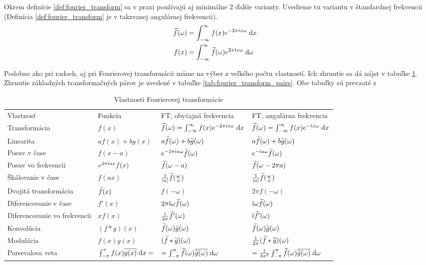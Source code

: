 Okrem definície \ref{def:fourier_transform} sa v praxi používajú aj
minimálne 2 ďalšie varianty. Uvedieme tu variantu v štandardnej
frekvencii (Definícia \ref{def:fourier_transform} je v takzvanej
angulárnej frekvencii).
\begin{eqnarray}
    \widetilde{f}(\omega) &= \int_{-\infty}^{\infty} f(x) e^{-2\pi\hat{\imath} x \omega} \; \mathrm{d} x\\
    f(x) &= \int_{-\infty}^{\infty} \widetilde{f}(\omega) e^{2\pi\hat{\imath} x \omega} \; \mathrm{d}
    \omega
\end{eqnarray}

Podobne ako pri radoch, aj pri Fourierovej transformácii máme na výber
z veľkého počtu vlastností. Ich zhrnutie sa dá nájst v tabuľke
\ref{tab:fourier_transform_vlastnosti}. Zhrnutie základných
transformačných párov je uvedené v tabuľke
\ref{tab:fourier_transform_pairs}. Obe tabuľky sú prevzaté z
\cite{wiki:fourier_transform}

\begin{table}[htp]
    \centering
    \begin{tabular}{llll}
    Vlastnosť&Funkcia&FT, obyčajná frekvencia&FT, angulárna
    frekvencia\\
    Transformácia&$f(x)$&
        $\widetilde{f}(\omega) = \int_{-\infty}^{\infty} f(x) e^{-2\pi\hat{\imath} x\omega} \; \mathrm{d} x$&
        $\widetilde{f}(\omega) = \int_{-\infty}^{\infty} f(x) e^{-\hat{\imath} x \omega} \; \mathrm{d} x$\\
    Linearita&$a f(x) + b g(x)$&
        $a \widetilde{f}(\omega) + b \widetilde{g}(\omega)$&
        $a \widetilde{f}(\omega) + b \widetilde{g}(\omega)$\\
    Posuv v čase&$f(x-a)$&
        $e^{-2\pi\hat{\imath} a \omega} \widetilde{f}(\omega)$&
        $e^{-\hat{\imath} a \omega} \widetilde{f}(\omega)$\\
    Posuv vo frekvencii&$ e^{2\pi\hat{\imath} a x} f(x)$&
        $\widetilde{f}(\omega-a)$&
        $\widetilde{f}(\omega-2\pi a)$\\
    Škálovanie v čase&$ f(a x)$&
        $\frac{1}{|a|}\widetilde{f}(\frac{\omega}{a})$&
        $\frac{1}{|a|}\widetilde{f}(\frac{\omega}{a})$\\
    Dvojitá transformácia&$ \widetilde{f}(x)$&
        $f(-\omega)$&
        $2\pi f(-\omega)$\\
    Diferencovanie v čase&$ f'(x)$&
        $2\pi\hat{\imath}\omega \widetilde{f}(\omega)$&
        $\hat{\imath}\omega \widetilde{f}(\omega)$\\
    Diferencovanie vo frekvencii&$x f(x)$&
        $\frac{\hat{\imath}}{2\pi} \widetilde{f}'(\omega)$&
        $\hat{\imath} \widetilde{f}'(\omega)$\\
    Konvolúcia&$ (f*g)(x)$&
        $\widetilde{f}(\omega) \widetilde{g}(\omega)$&
        $\widetilde{f}(\omega) \widetilde{g}(\omega)$\\
    Modulácia&$ f(x)g(x)$&
        $(\widetilde{f}*\widetilde{g})(\omega)$&
        $\frac{1}{2\pi}(\widetilde{f}*\widetilde{g})(\omega)$\\
    Parsevalova veta&
      $\int_{-\pi}^{\pi} f(x)\overline{g(x)} \; \mathrm{d} x=$&
      $=\int_{-\pi}^{\pi} \widetilde{f}(\omega) \overline{\widetilde{g}(\omega)} \; \mathrm{d}\omega$&
      $=\frac{1}{4\pi^2}\int_{-\pi}^{\pi} \widetilde{f}(\omega) \overline{\widetilde{g}(\omega)}
      \; \mathrm{d}\omega$\\
    \end{tabular}
    \caption{Vlastnosti Fourierovej transformácie}
    \label{tab:fourier_transform_vlastnosti}
\end{table}

